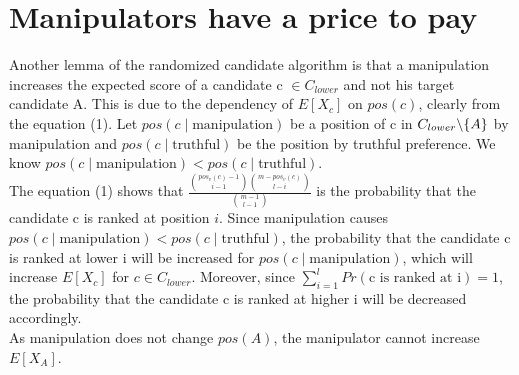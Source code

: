 \documentclass[letterpaper]{article} %
\begin{document}
\section{Manipulators have a price to pay}
Another lemma of the randomized candidate algorithm is that a manipulation increases the expected score of a candidate c $\in C_{lower}$ and not his target candidate A. This is due to the dependency of $E[X_c]$ on $pos(c)$, clearly from the equation (1). Let $pos(c \mid \text{manipulation})$ be a position of c in $C_{lower} \symbol{92}\text{\{} A\text{\}}$ by manipulation and $pos(c\mid \text{truthful})$ be the position by truthful preference. We know $pos(c \mid \text{manipulation}) < pos(c\mid \text{truthful})$. \\
The equation (1) shows that $ \frac{\binom{pos_v(c)-1}{i-1}\binom{m-pos_v(c)}{l-i}}{\binom{m-1}{l-1}}$ is the probability that the candidate c is ranked at position $i$. Since manipulation causes $pos(c \mid \text{manipulation}) < pos(c\mid \text{truthful})$, the probability that the candidate c is ranked at lower i will be increased for $pos(c \mid \text{manipulation})$, which will increase $E[X_c]$ for $c \in C_{lower}$. Moreover, since $\sum_{i=1}^l Pr(\text{c is ranked at i}) =1$,  the probability that the candidate c is ranked at higher i will be decreased accordingly.\\ As manipulation does not change $pos(A)$, the manipulator cannot increase $E[X_A]$.


\end{document}
